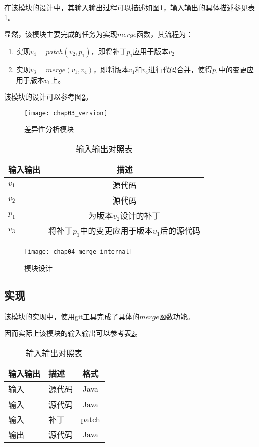 在该模块的设计中，其输入输出过程可以描述如图\ref {version}，输入输出的具体描述参见表\ref {version_io}。

显然，该模块主要完成的任务为实现$merge$函数，其流程为：
\begin{enumerate}
	\item 实现$v_4 = patch(v_2,p_1)$，即将补丁$p_1$应用于版本$v_2$
	\item 实现$v_3 = merge(v_1,v_4)$，即将版本$v_1$和$v_4$进行代码合并，使得$p_1$中的变更应用于版本$v_1$上。
\end{enumerate}

该模块的设计可以参考图\ref {merge_des}。

\begin{figure}[H]
	\centering
	\texttt{[image: chap03\_version]}
	\caption {差异性分析模块}
	\label {version}	
\end{figure}

\begin{table}[H]
	\caption{输入输出对照表}
	\label{version_io}
	\centering
	\begin{tabular}{lc}
		\toprule[1.5pt]
		{\heiti 输入输出} & {\heiti 描述}\\\midrule[1pt]
		$v_1$ & 源代码 \\
		$v_2$ & 源代码 \\
		$p_1$ & 为版本$v_2$设计的补丁 \\
		$v_3$ & 将补丁$p_1$中的变更应用于版本$v_1$后的源代码 \\
		\bottomrule[1.5pt]
	\end{tabular}
\end{table}

\begin{figure}[H]
	\centering
	\texttt{[image: chap04\_merge\_internal]}
	\caption {模块设计}
	\label {merge_des}	
\end{figure}

\subsection{实现}

该模块的实现中，使用git工具完成了具体的$merge$函数功能。

因而实际上该模块的输入输出可以参考表\ref {version_io2}。

\begin{table}[H]
	\caption{输入输出对照表}
	\label{version_io2}
	\centering
	\begin{tabular}{llc}
		\toprule[1.5pt]
		{\heiti 输入输出} & {\heiti 描述} & {\heiti 格式}\\\midrule[1pt]
		输入 & 源代码 & Java\\
		输入 & 源代码 & Java\\
		输入 & 补丁 & patch\\
		输出 & 源代码 & Java\\
		\bottomrule[1.5pt]
	\end{tabular}
\end{table}


